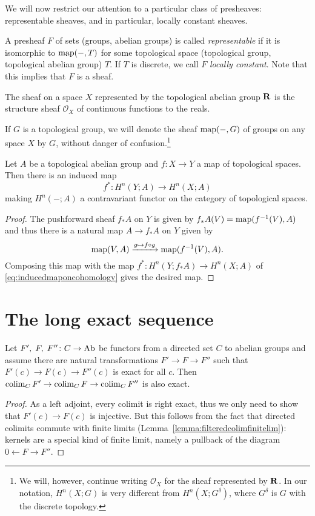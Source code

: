 \documentclass[a4paper,openany]{scrbook}
\begin{document}
We will now restrict our attention to a particular class of presheaves: representable sheaves, and in particular, locally constant sheaves.

\begin{defn}
A presheaf $F$ of sets (groups, abelian groups) is called \emph{representable} if it is isomorphic to $\operatorname{map}(-,T)$ for some topological space (topological group, topological abelian group) $T$. If $T$ is discrete, we call $F$ \emph{locally constant}. Note that this implies that $F$ is a sheaf.
\end{defn}

\begin{example}
The sheaf on a space $X$ represented by the topological abelian group $\mathbf R$ is the structure sheaf $\mathcal O_{X}$ of continuous functions to the reals.
\end{example}

If $G$ is a topological group, we will denote the sheaf $\operatorname{map}(-,G)$ of groups on any space $X$ by $G$, without danger of confusion.\footnote{We will, however, continue writing $\mathcal O_{X}$ for the sheaf represented by $\mathbf R$. In our notation, $H^n(X;G)$ is very different from $H^n(X;G^\delta)$, where $G^\delta$ is $G$ with the discrete topology.}

\begin{lemma}
Let $A$ be a topological abelian group and $f\colon X \to Y$ a map of topological spaces. Then there is an induced map
\[
f^*\colon H^n(Y;A) \to H^n(X;A)
\]
making $H^n(-;A)$ a contravariant functor on the category of topological spaces.
\end{lemma}
\begin{proof}
The pushforward sheaf $f_*A$ on $Y$ is given by $f_*A(V) = \operatorname{map}(f^{-1}(V),A)$ and thus there is a natural map $A \to f_*A$ on $Y$ given by
\[
\operatorname{map}(V,A) \xrightarrow{g \mapsto f \circ g} \operatorname{map}(f^{-1}(V),A).
\] 
Composing this map with the map $f^*\colon H^n(Y;f_*A) \to H^n(X;A)$ of \eqref{eq:inducedmaponcohomology} gives the desired map.
\end{proof}

\section{The long exact sequence}

\begin{lemma}\label{lemma:colimexact}
Let $F', \; F,\; F''\colon C \to \operatorname{Ab}$ be functors from a directed set $C$ to abelian groups and assume there are natural transformations $F' \to F \to F''$ such that $F'(c) \to F(c) \to F''(c) $ is exact for all $c$. Then $\operatorname*{colim}_C F' \to \operatorname*{colim}_C F \to \operatorname*{colim}_C F''$ is also exact.
\end{lemma}
\begin{proof}
As a left adjoint, every colimit is right exact, thus we only need to show that $F'(c) \to F(c)$ is injective. But this follows from the fact that directed colimits commute with finite limits (Lemma~\ref{lemma:filteredcolimfinitelim}): kernels are a special kind of finite limit, namely a pullback of the diagram $0 \leftarrow F \rightarrow F''$.
\end{proof}
\end{document}
